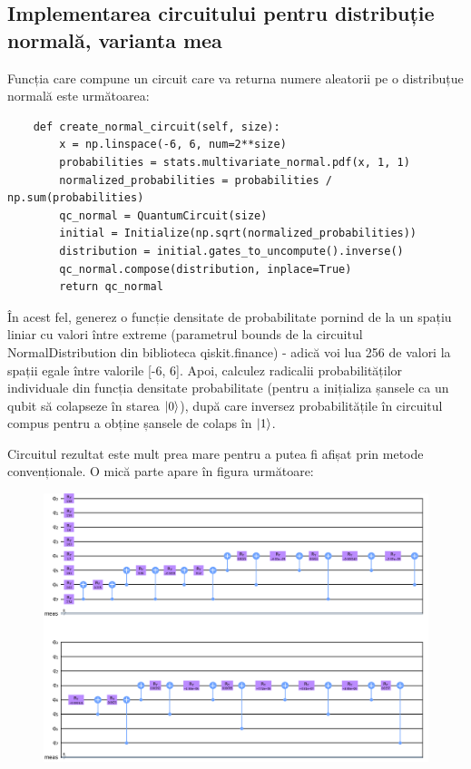 \subsection{Implementarea circuitului pentru distribuție normală, varianta mea}
Funcția care compune un circuit care va returna numere aleatorii pe o distribuțue normală este următoarea:
\begin{code}
\begin{verbatim}
    def create_normal_circuit(self, size):
        x = np.linspace(-6, 6, num=2**size)
        probabilities = stats.multivariate_normal.pdf(x, 1, 1)
        normalized_probabilities = probabilities / np.sum(probabilities)
        qc_normal = QuantumCircuit(size)
        initial = Initialize(np.sqrt(normalized_probabilities))
        distribution = initial.gates_to_uncompute().inverse()
        qc_normal.compose(distribution, inplace=True)
        return qc_normal
\end{verbatim}
\end{code}
În acest fel, generez o funcție densitate de probabilitate pornind de la un spațiu liniar cu valori între extreme (parametrul bounds de la circuitul NormalDistribution din biblioteca qiskit.finance) - adică voi lua 256 de valori la spații egale între valorile [-6, 6]. Apoi, calculez radicalii probabilităților individuale din funcția densitate probabilitate (pentru a inițializa șansele ca un qubit să colapseze în starea $\ket{0}$), după care inversez probabilitățile în circuitul compus pentru a obține șansele de colaps în $\ket{1}$. 

Circuitul rezultat este mult prea mare pentru a putea fi afișat prin metode convenționale. O mică parte apare în figura următoare:
\begin{figure}[H]
    \centering
    \includegraphics[width=1.0\textwidth]{continut/capitol3/figuri/CircuitNormal.png}
    \label{fig:CircuitNormal}
\end{figure}

